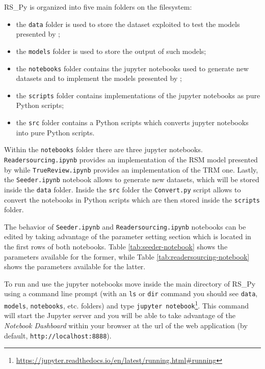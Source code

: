 \documentclass[a4paper, english]{article}
\begin{document}
RS\_Py is organized into five main folders on the filesystem:
\begin{itemize}
\item the \verb|data| folder is used to store the dataset exploited to test the models presented by \citet{Soprano2019};
\item the \verb|models| folder is used to store the output of such models;
\item the \verb|notebooks| folder contains the jupyter notebooks used to generate new datasets and to implement the models presented by \citet{Soprano2019};
\item the \verb|scripts| folder contains implementations of the jupyter notebooks as pure Python scripts;
\item the \verb|src| folder contains a Python scripts which converts jupyter notebooks into pure Python scripts. 
\end{itemize}

Within the \verb|notebooks| folder there are three jupyter notebooks. \verb|Readersourcing.ipynb| provides an implementation of the RSM model presented by \citet{Soprano2019} while \verb|TrueReview.ipynb| provides an implementation of the TRM one. Lastly, the \verb|Seeder.ipynb| notebook allows to generate new datasets, which will be stored inside the \verb|data| folder. Inside the \verb|src| folder the \verb|Convert.py| script allows to convert the notebooks in Python scripts which are then stored inside the \verb|scripts| folder. 

The behavior of \verb|Seeder.ipynb| and \verb|Readersourcing.ipynb| notebooks can be edited by taking advantage of the parameter setting section which is located in the first rows of both notebooks. Table \ref{tab:seeder-notebook} shows the parameters available for the former, while Table \ref{tab:readersourcing-notebook} shows the parameters available for the latter. 

To run and use the jupyter notebooks move inside the main directory of RS\_Py using a command line prompt (with an \verb|ls| or \verb|dir| command you should see \verb|data|, \verb|models|, \verb|notebooks|, etc. folders) and type \verb|jupyter notebook|\footnote{\url{https://jupyter.readthedocs.io/en/latest/running.html\#running}}. This command will start the Jupyter server and you will be able to take advantage of the \emph{Notebook Dashboard} within your browser at the url of the web application (by default, \verb|http://localhost:8888|).
\end{document}
